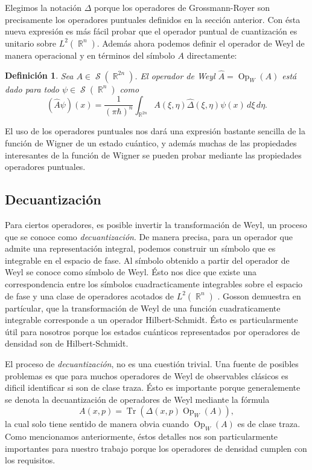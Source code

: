 \documentclass[a4paper]{report}
\DeclareMathOperator{\R}{\mathbb{R}}
\DeclareMathOperator{\Sz}{\mathcal S}
\DeclareMathOperator{\Tr}{Tr}
\DeclareMathOperator{\Op}{Op}
\newtheorem{definition}{Definición}
\begin{document}
  Elegimos la notación $\Delta$ porque los operadores de
  Grossmann-Royer son precisamente los operadores puntuales
  definidos en la sección anterior. Con ésta nueva expresión
  es más fácil probar que el operador puntual de
  cuantización es unitario sobre $L^2(\R^{n})$.  Además
  ahora podemos definir el operador de Weyl de manera
  operacional y en términos del símbolo $A$ directamente:
  \begin{definition}
    Sea $A \in \Sz(\R^{2n})$. El operador de Weyl $\hat{A} =
    \Op_W(A)$ está dado para todo $\psi \in \Sz(\R^{n})$ 
    como
    \begin{equation}
      \left( \hat{A}\psi \right)(x)
      = \frac{1}{(\pi\hbar)^{n}} \int_{\R^{2n}}
      A(\xi,\eta)\hat{\Delta}(\xi,\eta)\psi(x) \, d\xi \,
      d\eta.
    \end{equation}
  \end{definition}
  El uso de los operadores puntuales nos dará una expresión
  bastante sencilla de la función de Wigner de un estado
  cuántico, y además muchas de las propiedades interesantes
  de la función de Wigner se pueden probar mediante
  las propiedades operadores puntuales.

  \subsection{Decuantización}

  Para ciertos operadores, es posible invertir la
  transformación de Weyl, un proceso que se conoce como
  \textit{decuantización}. De manera precisa, para un
  operador que admite una representación integral, podemos
  construir un símbolo que es integrable en el espacio de
  fase. Al símbolo obtenido a partir del operador de Weyl se
  conoce como símbolo de Weyl. Ésto nos dice que existe una
  correspondencia entre los símbolos cuadracticamente
  integrables sobre el espacio de fase y una clase de
  operadores acotados de $L^2(\R^{n})$ \cite{degosson2016}.
  Gosson demuestra en partícular, que la transformación de
  Weyl de una función cuadraticamente integrable corresponde
  a un operador Hilbert-Schmidt. Ésto es particularmente
  útil para nosotros porque los estados cuánticos
  representados por operadores de densidad son de
  Hilbert-Schmidt.

  El proceso de \textit{decuantización}, no es una cuestión
  trivial. Una fuente de posibles problemas es que para
  muchos operadores de Weyl de observables clásicos es
  dificil identificar si son de clase traza. Ésto es
  importante porque generalemente se denota la
  decuantización de operadores de Weyl mediante la fórmula
  \[
    A(x,p)
    = \Tr\left( \Delta(x,p) \Op_W(A) \right),
  \] 
  la cual solo tiene sentido de manera obvia cuando
  $\Op_W(A)$ es de clase traza. Como mencionamos
  anteriormente, éstos detalles nos son particularmente
  importantes para nuestro trabajo porque los operadores de
  densidad cumplen con los requisitos.
\end{document}
